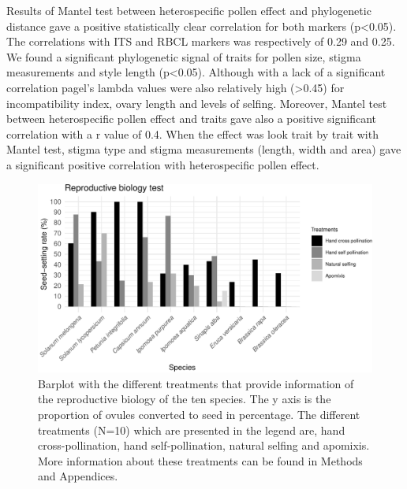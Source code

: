 \documentclass[11pt,a4paper]{article}
\begin{document}
Results of Mantel test between heterospecific pollen effect and
phylogenetic distance gave a positive statistically clear correlation
for both markers (p\textless{}0.05). The correlations with ITS and RBCL
markers was respectively of 0.29 and 0.25. We found a significant
phylogenetic signal of traits for pollen size, stigma measurements and
style length (p\textless{}0.05). Although with a lack of a significant
correlation pagel's lambda values were also relatively high
(\textgreater{}0.45) for incompatibility index, ovary length and levels
of selfing. Moreover, Mantel test between heterospecific pollen effect
and traits gave also a positive significant correlation with a r value
of 0.4. When the effect was look trait by trait with Mantel test, stigma
type and stigma measurements (length, width and area) gave a significant
positive correlation with heterospecific pollen effect.

\newpage

\begin{figure}

{\centering \includegraphics{output/figures/unnamed-chunk-3-1} 

}

\caption{Barplot with the different treatments that provide information of the reproductive biology of the ten species. The y axis is the proportion of ovules converted to seed in percentage. The different treatments (N=10) which are presented in the legend are, hand cross-pollination, hand self-pollination, natural selfing and apomixis. More information about these treatments can be found in Methods and Appendices.}\label{fig:unnamed-chunk-3}
\end{figure}

\newpage
\end{document}
